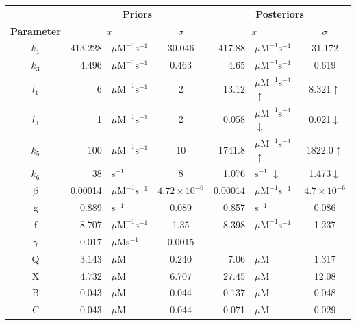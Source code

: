 \begin{table}[tbp]%
\renewcommand{\arraystretch}{1.5}
\begin{center}
\begin{tabular}{crlc|rlc}
\toprule
& \multicolumn{3}{c}{\textbf{Priors}} & \multicolumn{3}{c}{\textbf{Posteriors}} \\
\textbf{Parameter} & \multicolumn{2}{c}{${\bar{x}}$} & $\sigma$ & \multicolumn{2}{c}{${\bar{x}}$} & $\sigma$\\
\midrule
$k_1$ & 413.228 & $\mu \mathrm{M}^{-1} \mathrm{s}^{-1}$ & 30.046 & 417.88 & $\mu \mathrm{M}^{-1} \mathrm{s}^{-1}$ & 31.172\\
$k_3$ & 4.496 & $\mu \mathrm{M}^{-1} \mathrm{s}^{-1}$ & 0.463 & 4.65 & $\mu \mathrm{M}^{-1} \mathrm{s}^{-1}$ & 0.619\\
$l_1$ & 6 & $\mu \mathrm{M}^{-1} \mathrm{s}^{-1}$ & 2 & 13.12 & $\mu \mathrm{M}^{-1} \mathrm{s}^{-1}$ $\uparrow$ & 8.321$\uparrow$\\
$l_3$ & 1 & $\mu \mathrm{M}^{-1} \mathrm{s}^{-1}$ & 2 & 0.058 & $\mu \mathrm{M}^{-1} \mathrm{s}^{-1}$ $\downarrow$ & 0.021$\downarrow$\\
$k_5$ & 100 & $\mu \mathrm{M}^{-1} \mathrm{s}^{-1}$ & 10 & 1741.8 & $\mu \mathrm{M}^{-1} \mathrm{s}^{-1}$ $\uparrow$ & 1822.0$\uparrow$\\
$k_6$ & 38 & $\mathrm{s}^{-1}$ & 8 & 1.076 & $\mathrm{s}^{-1}$ $\downarrow$ & 1.473$\downarrow$\\
$\beta$ & 0.00014 & $\mu \mathrm{M}^{-1} \mathrm{s}^{-1}$ & $4.72\times 10^{-6}$ & 0.00014 & $\mu \mathrm{M}^{-1} \mathrm{s}^{-1}$ & $4.7\times 10^{-6}$\\
g & 0.889 & $\mathrm{s}^{-1}$ & 0.089 & 0.857 & $\mathrm{s}^{-1}$ & 0.086\\
f & 8.707 & $\mu \mathrm{M}^{-1} \mathrm{s}^{-1}$ & 1.35 & 8.398 & $\mu \mathrm{M}^{-1} \mathrm{s}^{-1}$ & 1.237\\
$\gamma$ & 0.017 & $\mu \mathrm{M} \mathrm{s}^{-1}$ & 0.0015 & \\
Q & 3.143 & $\mu \mathrm{M}$ & 0.240 & 7.06 & $\mu \mathrm{M}$ & 1.317\\
X & 4.732 & $\mu \mathrm{M}$ & 6.707 & 27.45 & $\mu \mathrm{M}$ & 12.08\\
B & 0.043 & $\mu \mathrm{M}$ & 0.044 & 0.137 & $\mu \mathrm{M}$ & 0.048\\
C & 0.043 & $\mu \mathrm{M}$ & 0.044 & 0.071 & $\mu \mathrm{M}$ & 0.029\\
\bottomrule
\end{tabular}

\end{center}
\end{table}
